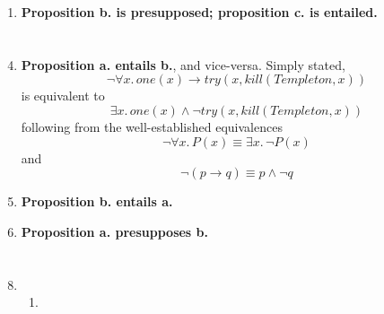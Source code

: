 \documentclass[12pt,a4paper]{article}
\begin{document}
\begin{enumerate}
\item \textbf{Proposition b. is presupposed; proposition c. is entailed.}
\end{enumerate}


\part{}
\begin{enumerate}
\setcounter{enumi}{3}
\item \textbf{Proposition a. entails b.}, and vice-versa. Simply stated,
\[
\neg \forall x.\, one(x) \rightarrow try(x, kill(Templeton, x))
\]
is equivalent to
\[
\exists x.\, one(x) \wedge \neg try(x, kill(Templeton, x))
\]
following from the well-established equivalences
\[
\neg \forall x.\, P(x) \equiv \exists x.\, \neg P(x)
\]
and
\[
\neg (p \rightarrow q) \equiv p \wedge \neg q
\]

\item \textbf{Proposition b. entails a.}

\item \textbf{Proposition a. presupposes b.}
\end{enumerate}


\part{}
\begin{enumerate}
\setcounter{enumi}{7}
\item 
\begin{enumerate}

\item 

\end{enumerate}
\end{enumerate}
\end{document}
